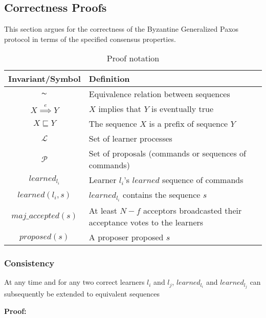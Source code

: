 \subsection{Correctness Proofs}

This section argues for the correctness of the Byzantine Generalized Paxos protocol in terms of the specified consensus properties.\par


\begin{table}[h!]
	\renewcommand{\arraystretch}{1.5}
	\centering
	\begin{tabularx}{\linewidth}{ |c|X|}
		\hline
		Invariant/Symbol & Definition \\
		\hline
		$\thicksim$ & Equivalence relation between sequences \\
		\hline
		$X \overset{e}{\implies} Y$ & $X$ implies that $Y$ is eventually true \\
		\hline
		$X \sqsubseteq Y$ & The sequence $X$ is a prefix of sequence $Y$ \\
		\hline
		$\mathcal{L}$ & Set of learner processes \\
		\hline
		$\mathcal{P}$ & Set of proposals (commands or sequences of commands) \\
		\hline
		$learned_{l_i}$ & Learner $l_i$'s $learned$ sequence of commands \\
		\hline
		$learned(l_i,s)$ & $learned_{l_i}$ contains the sequence $s$ \\
		\hline
		$maj\_accepted(s)$ & At least $N-f$ acceptors broadcasted their acceptance votes to the learners\\
		\hline
		$proposed(s)$ & A proposer proposed $s$ \\
		\hline
		
  	\end{tabularx} 
	\caption{Proof notation} 
	\label{table:1}
\end{table}

\subsubsection{Consistency}
\begin{theorem}At any time and for any two correct learners $l_i$ and $l_j$, $learned_{l_i}$ and $learned_{l_j}$ can subsequently be extended to equivalent sequences \par
\end{theorem} 
\textbf{Proof:} \par

